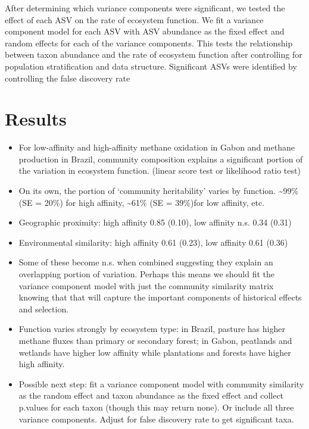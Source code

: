 \documentclass{article}
\begin{document}
After determining which variance components were significant, we tested the
effect of each ASV on the rate of ecosystem function. We fit a variance
component model for each ASV with ASV abundance as the fixed effect and random
effects for each of the variance components. This tests the relationship between
taxon abundance and the rate of ecosystem function after controlling for
population stratification and data structure. Significant ASVs were identified
by controlling the false discovery rate 

\section{Results}

\begin{itemize}
  \item For low-affinity and high-affinity methane oxidation in Gabon and
    methane production in Brazil, community composition explains a significant
    portion of the variation in ecosystem function. (linear score test or
    likelihood ratio test)
  \item On its own, the portion of `community heritability' varies by function.
    \textasciitilde99\% (SE = 20\%) for high affinity, \textasciitilde61\% (SE =
    39\%)for low affinity, etc. 
  \item Geographic proximity: high affinity 0.85 (0.10), low affinity n.s. 0.34
    (0.31)
  \item Environmental similarity: high affinity 0.61 (0.23), low affinity 0.61 (0.36) 
  \item Some of these become n.s. when combined suggesting they explain an
    overlapping portion of variation. Perhaps this means we should fit the
    variance component model with just the community similarity matrix knowing
    that that will capture the important components of historical effects and
    selection.
  \item Function varies strongly by ecosystem type: in Brazil, pasture has
    higher methane fluxes than primary or secondary forest; in Gabon, peatlands
    and wetlands have higher low affinity while plantations and forests have
    higher high affinity.
  \item Possible next step: fit a variance component model with community
    similarity as the random effect and taxon abundance as the fixed effect and
    collect p.values for each taxon (though this may return none). Or include
    all three variance components. Adjust for false discovery rate to get
    significant taxa.
\end{itemize}
\end{document}
